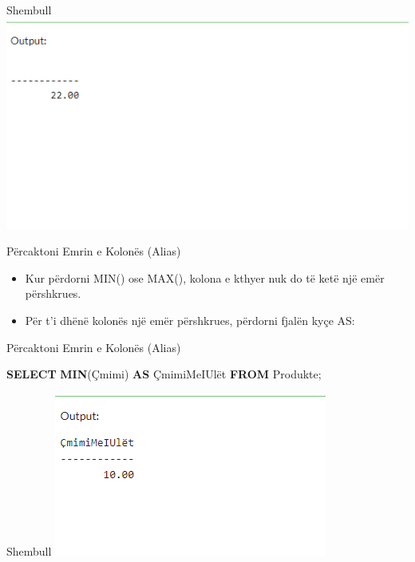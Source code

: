 \documentclass[
  ignorenonframetext,
]{beamer}
\newenvironment{Shaded}{\begin{snugshade}}{\end{snugshade}}
\newcommand{\FunctionTok}[1]{\textcolor[rgb]{0.13,0.29,0.53}{\textbf{#1}}}
\newcommand{\KeywordTok}[1]{\textcolor[rgb]{0.13,0.29,0.53}{\textbf{#1}}}
\newcommand{\NormalTok}[1]{#1}
\begin{document}
\begin{frame}{Shembull}
\label{shembull-19}
\includegraphics{./Figs/query43.png}
\end{frame}

\begin{frame}{Përcaktoni Emrin e Kolonës (Alias)}
\label{puxebrcaktoni-emrin-e-kolonuxebs-alias}
\begin{itemize}
\item
  Kur përdorni MIN() ose MAX(), kolona e kthyer nuk do të ketë një emër
  përshkrues.
\item
  Për t'i dhënë kolonës një emër përshkrues, përdorni fjalën kyçe AS:
\end{itemize}
\end{frame}

\begin{frame}[fragile]{Përcaktoni Emrin e Kolonës (Alias)}
\label{puxebrcaktoni-emrin-e-kolonuxebs-alias-1}

\begin{Shaded}
\begin{Highlighting}[]
\KeywordTok{SELECT} \FunctionTok{MIN}\NormalTok{(Çmimi) }\KeywordTok{AS}\NormalTok{ ÇmimiMeIUlët}
\KeywordTok{FROM}\NormalTok{ Produkte;}
\end{Highlighting}
\end{Shaded}
\end{frame}

\begin{frame}{Shembull}
\label{shembull-20}
\includegraphics{./Figs/query44.png}
\end{frame}
\end{document}
